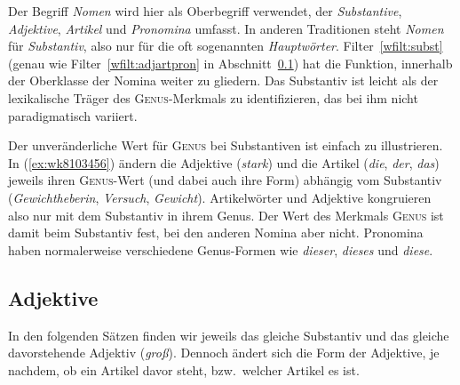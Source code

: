 \label{sec:substantivewortklassen}

Der Begriff \textit{Nomen} wird hier als Oberbegriff verwendet, der \textit{Substantive}, \textit{Adjektive}, \textit{Artikel} und \textit{Pronomina} umfasst.
In anderen Traditionen steht \textit{Nomen} für \textit{Substantiv}, also nur für die oft sogenannten \textit{Hauptwörter}.
Filter~\ref{wfilt:subst} (genau wie Filter~\ref{wfilt:adjartpron} in Abschnitt~\ref{sec:adjektivewortklassen}) hat die Funktion, innerhalb der Oberklasse der Nomina weiter zu gliedern.
Das Substantiv ist leicht als der lexikalische Träger des \textsc{Genus}-Merkmals zu identifizieren, das bei ihm nicht paradigmatisch variiert.


Der unveränderliche Wert für \textsc{Genus} bei Substantiven ist einfach zu illustrieren.
In (\ref{ex:wk8103456}) ändern die Adjektive (\textit{stark}) und die Artikel (\textit{die}, \textit{der}, \textit{das}) jeweils ihren \textsc{Genus}-Wert (und dabei auch ihre Form) abhängig vom Substantiv (\textit{Gewichtheberin}, \textit{Versuch}, \textit{Gewicht}).
Artikelwörter und Adjektive kongruieren also nur mit dem Substantiv in ihrem Genus.
Der Wert des Merkmals \textsc{Genus} ist damit beim Substantiv fest, bei den anderen Nomina aber nicht.
Pronomina haben normalerweise verschiedene Genus-Formen wie \textit{dieser}, \textit{dieses} und \textit{diese}.

\begin{exe}
  \ex\label{ex:wk8103456}
  \begin{xlist}
  \end{xlist}
\end{exe}

\subsection{Adjektive}

\label{sec:adjektivewortklassen}

In den folgenden Sätzen finden wir jeweils das gleiche Substantiv und das gleiche davorstehende Adjektiv (\textit{groß}).
Dennoch ändert sich die Form der Adjektive, je nachdem, ob ein Artikel davor steht, bzw.\ welcher Artikel es ist.

